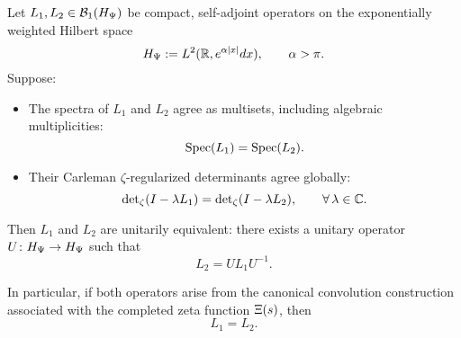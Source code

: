 \begin{proposition}
\label{prop:inverse_spectral_rigidity}

Let \( L_1, L_2 \in \mathcal{B}_1(H_{\Psi}) \) be compact, self-adjoint operators on the exponentially weighted Hilbert space
\[
H_{\Psi} := L^2(\mathbb{R}, e^{\alpha |x|} dx), \qquad \alpha > \pi.
\]
Suppose:
\begin{itemize}
  \item The spectra of \( L_1 \) and \( L_2 \) agree as multisets, including algebraic multiplicities:
  \[
  \operatorname{Spec}(L_1) = \operatorname{Spec}(L_2).
  \]

  \item Their Carleman \(\zeta\)-regularized determinants agree globally:
  \[
  \det\nolimits_\zeta(I - \lambda L_1) = \det\nolimits_\zeta(I - \lambda L_2), \qquad \forall\, \lambda \in \mathbb{C}.
  \]
\end{itemize}

Then \( L_1 \) and \( L_2 \) are unitarily equivalent: there exists a unitary operator \( U \colon H_{\Psi} \to H_{\Psi} \) such that
\[
L_2 = U L_1 U^{-1}.
\]

\medskip

\noindent
In particular, if both operators arise from the canonical convolution construction associated with the completed zeta function \( \Xi(s) \), then
\[
L_1 = L_2.
\]
\end{proposition}
